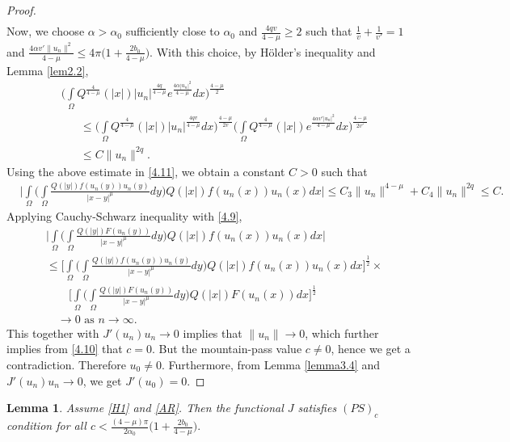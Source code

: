 \documentclass[11pt]{amsart}
\numberwithin{equation}{section}
\newtheorem{lem}[thm]{Lemma}
\newcommand{\1}{\frac{1}{2}}
\begin{document}
\begin{proof}
\begin{align}
		\end{align}
		Now, we choose $\alpha > \alpha_0$ sufficiently close to $\alpha_0$ and $\frac{4qv}{4-\mu} \geq 2$ such that $\frac{1}{v}+\frac{1}{v'}=1$ and $\frac{4\alpha v' \|u_n\|^2}{4-\mu} \leq 4\pi \Big(1+\frac{2b_0}{4-\mu}\Big)$. With this choice, by H\"older's inequality and Lemma \ref{lem2.2},
		\begin{align}
			&\Bigg(\int\limits_\Omega Q^{\frac{4}{4-\mu}}(|x|) |u_n|^{\frac{4q}{4-\mu}} e^{\frac{4\alpha |u_n|^2}{4-\mu}} dx \Bigg)^{\frac{4-\mu}{2}}\nonumber\\
			& \quad \ \ \ \leq \Bigg( \int\limits_\Omega Q^{\frac{4}{4-\mu}}(|x|) |u_n|^{\frac{4qv}{4-\mu}}dx \Bigg)^{\frac{4-\mu}{2v}} \Bigg( \int\limits_\Omega Q^{\frac{4}{4-\mu}}(|x|) e^{\frac{4\alpha v'|u_n|^2}{4-\mu}} dx \Bigg)^{\frac{4-\mu}{2v'}}\nonumber\\
			& \quad \ \ \  \leq C \|u_n\|^{2q}. \nonumber
		\end{align}
		Using the above estimate in \eqref{4.11}, we obtain a constant $C>0$ such that
		\begin{align}
			&\Bigg| \int\limits_\Omega \Bigg( \int\limits_\Omega \frac{Q(|y|)f(u_n(y))u_n(y)}{|x-y|^\mu}dy \Bigg) Q(|x|) f(u_n(x)) u_n(x) dx\Bigg| \leq C_3 \|u_n\|^{4-\mu} + C_4\|u_n\|^{2q} \leq C. \nonumber
		\end{align}
		Applying Cauchy-Schwarz inequality with \eqref{4.9}, 
		\begin{align*}
			&\Bigg| \int\limits_\Omega \Bigg( \int\limits_\Omega \frac{Q(|y|)F(u_n(y))}{|x-y|^\mu}dy \Bigg) Q(|x|) f(u_n(x)) u_n(x) dx\Bigg| \\
			&\leq \Bigg[ \int\limits_\Omega \Bigg( \int\limits_\Omega \frac{Q(|y|)f(u_n(y))u_n(y)}{|x-y|^\mu}dy \Bigg) Q(|x|) f(u_n(x)) u_n(x) dx\Bigg]^{\1} \times\\
			& \quad \quad \Bigg[ \int\limits_\Omega \Bigg( \int\limits_\Omega \frac{Q(|y|)F(u_n(y))}{|x-y|^\mu}dy \Bigg) Q(|x|) F(u_n(x)) dx\Bigg]^{\1}\\
			& \quad \rightarrow 0 \text{ as } n \rightarrow \infty.
		\end{align*}
		This together with $J'(u_n)u_n \to 0$ implies that $\|u_n\| \to 0$, which further implies from \eqref{4.10} that $c=0$. But the mountain-pass value $c\neq 0$, hence we get a contradiction. Therefore $u_0 \neq 0$. Furthermore, from Lemma \ref{lemma3.4} and $J'(u_n)u_n \rightarrow 0$, we get $J'(u_0)=0$.
	\end{proof}
	\begin{lem}
		\label{lem4.7}
		Assume \eqref{H1} and \eqref{AR}. Then the functional $J$ satisfies $(PS)_c$ condition for all $c< \frac{(4-\mu)\pi}{2\alpha_0}\Big( 1+\frac{2b_0}{4-\mu}\Big).$ 
	\end{lem}
\end{document}
